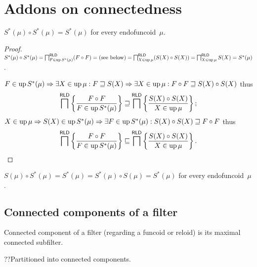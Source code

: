 \chapter{Addons on connectedness}

\begin{thm}
  $S^{\ast} (\mu) \circ S^{\ast} (\mu) = S^{\ast} (\mu)$
  for every endofuncoid~$\mu$.
\end{thm}

\begin{proof}
  $S^{\ast} (\mu) \circ S^{\ast} (\mu) = \bigsqcap^{\mathsf{RLD}}_{F
  \in \operatorname{up} S^{\ast} (\mu)} (F \circ F) = \text{(see below)} =
  \bigsqcap^{\mathsf{RLD}}_{X \in \operatorname{up} \mu} (S (X) \circ S (X)) =
  \bigsqcap^{\mathsf{RLD}}_{X \in \operatorname{up} \mu} S (X) = S^{\ast}
  (\mu)$.
  
  $F \in \operatorname{up} S^{\ast} (\mu) \Rightarrow \exists X \in \operatorname{up} \mu : F
  \sqsupseteq S (X) \Rightarrow \exists X \in \operatorname{up} \mu : F \circ F
  \sqsupseteq S (X) \circ S (X)$ thus
  \[ \bigsqcap^{\mathsf{RLD}} \left\{ \frac{ F \circ F}{
     F \in \operatorname{up} S^{\ast} (\mu) }\right\} \sqsupseteq
     \bigsqcap^{\mathsf{RLD}} \left\{ \frac{ S (X) \circ S (X) }{ X \in \operatorname{up} \mu }\right\} ; \]
  $X \in \operatorname{up} \mu \Rightarrow S (X) \in \operatorname{up} S^{\ast} (\mu)
  \Rightarrow \exists F \in \operatorname{up} S^{\ast} (\mu) : S (X) \circ S (X)
  \sqsupseteq F \circ F$ thus
  \[ \bigsqcap^{\mathsf{RLD}} \left\{ \frac{ F \circ F }{
     F \in \operatorname{up} S^{\ast} (\mu) }\right\} \sqsubseteq
     \bigsqcap^{\mathsf{RLD}} \left\{ \frac{ S (X) \circ S (X) }{ X \in \operatorname{up} \mu }\right\} . \]
\end{proof}

\begin{cor}
$S (\mu) \circ S^{\ast} (\mu) = S^{\ast} (\mu) =
S^{\ast} (\mu) \circ S (\mu) = S^{\ast} (\mu)$
for every endofuncoid~$\mu$.
\end{cor}

\section{Connected components of a filter}

\begin{defn}
Connected component of a filter (regarding a funcoid or reloid)
is its maximal connected subfilter.
\end{defn}

\begin{thm}
??Partitioned into connected components.
\end{thm}


